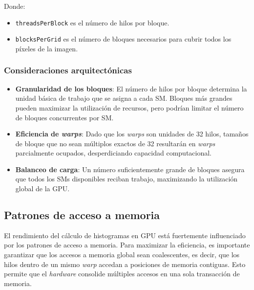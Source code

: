         Donde:
        
        \begin{itemize}
        
            \item \texttt{threadsPerBlock} es el número de hilos por bloque.
            
            \item \texttt{blocksPerGrid} es el número de bloques necesarios para cubrir todos los píxeles de la imagen.
            
        \end{itemize}

        \subsubsection{Consideraciones arquitectónicas}
        
            \begin{itemize}
            
                \item \textbf{Granularidad de los bloques}: El número de hilos por bloque determina la unidad básica de trabajo que se asigna a cada SM. Bloques más grandes pueden maximizar la utilización de recursos, pero podrían limitar el número de bloques concurrentes por SM.
                
                \item \textbf{Eficiencia de \textit{warps}}: Dado que los \textit{warps} son unidades de 32 hilos, tamaños de bloque que no sean múltiplos exactos de 32 resultarán en \textit{warps} parcialmente ocupados, desperdiciando capacidad computacional.
                
                \item \textbf{Balanceo de carga}: Un número suficientemente grande de bloques asegura que todos los SMs disponibles reciban trabajo, maximizando la utilización global de la GPU.
                
            \end{itemize}
        
    \subsection{Patrones de acceso a memoria}

        El rendimiento del cálculo de histogramas en GPU está fuertemente influenciado por los patrones de acceso a memoria. Para maximizar la eficiencia, es importante garantizar que los accesos a memoria global sean coalescentes, es decir, que los hilos dentro de un mismo \textit{warp} accedan a posiciones de memoria contiguas. Esto permite que el \textit{hardware} consolide múltiples accesos en una sola transacción de memoria.
        
